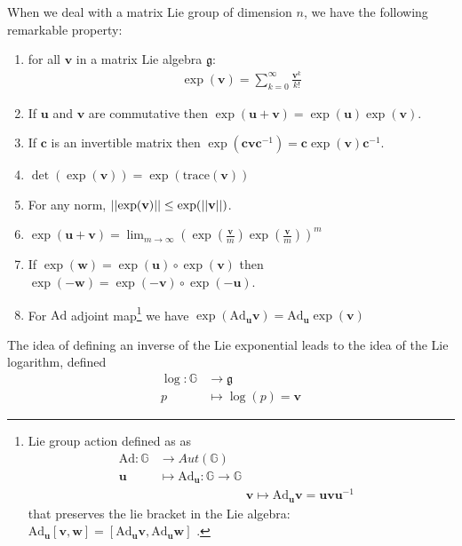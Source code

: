 When we deal with a matrix Lie group of dimension $n$, we have the following remarkable property:
\begin{enumerate}
	\item for all $\mathbf{v}$ in a matrix Lie algebra $\mathfrak{g}$:
	\begin{align*}
     \exp(\mathbf{v}) = \sum_{k=0}^{\infty} \frac{\mathbf{v}^{k}}{k!}
	\end{align*}
 	\item If $\mathbf{u}$ and $\mathbf{v}$ are commutative then $\exp(\mathbf{u} + \mathbf{v}) = \exp(\mathbf{u})\exp(\mathbf{v})$.
	\item If $\mathbf{c}$ is an invertible matrix then $\exp(\mathbf{c}\mathbf{v}\mathbf{c}^{-1}) = \mathbf{c}\exp(\mathbf{v})\mathbf{c}^{-1}$.
	\item $\det(\exp(\mathbf{v})) = \exp(\text{trace}(\mathbf{v}))$
 	\item For any norm, $\vert\lvert \exp(\mathbf{v}) \rvert\vert \leq \exp(\vert\lvert \mathbf{v} \rvert\vert)$.
 	\item  $\exp(\mathbf{u} + \mathbf{v}) =\lim_{m\rightarrow \infty} (\exp(\frac{\mathbf{v}}{m})\exp(\frac{\mathbf{v}}{m}))^{m}$
 	\item If $\exp(\mathbf{w}) = \exp(\mathbf{u}) \circ \exp(\mathbf{v})$ then $\exp(\mathbf{-w}) = \exp(\mathbf{-v}) \circ \exp(\mathbf{-u})$.
 	\item For $\text{Ad}$ adjoint map\footnote{Lie group action defined as
 		 as 
 		 \begin{align*}
 		 \text{Ad} :  \mathbb{G} & \longrightarrow  Aut(\mathbb{G}) &   \\
 		 \mathbf{u} &\longmapsto  \text{Ad}_{\mathbf{u}}  : \mathbb{G}  \longrightarrow  \mathbb{G} \\
 		 & \qquad \qquad \qquad \quad \mathbf{v} \longmapsto \text{Ad}_{\mathbf{u}}\mathbf{v} = \mathbf{u}\mathbf{v}\mathbf{u}^{-1}
 		 \end{align*}
 		 that preserves the lie bracket in the Lie algebra: $\text{Ad}_{\mathbf{u}}[\mathbf{v}, \mathbf{w} ] = [\text{Ad}_{\mathbf{u}} \mathbf{v}, \text{Ad}_{\mathbf{u}} \mathbf{w} ]$   .
 		 } we have $ \exp(\text{Ad}_{\mathbf{u}}\mathbf{v} ) = \text{Ad}_{\mathbf{u}}\exp(\mathbf{v})$
\end{enumerate}
The idea of defining an inverse of the Lie exponential leads to the idea of the Lie logarithm, defined
\begin{align*}
\log : \mathbb{G} & \longrightarrow \mathfrak{g} \\
p &\longmapsto \log (p)  =  \mathbf{v}   
\end{align*}
